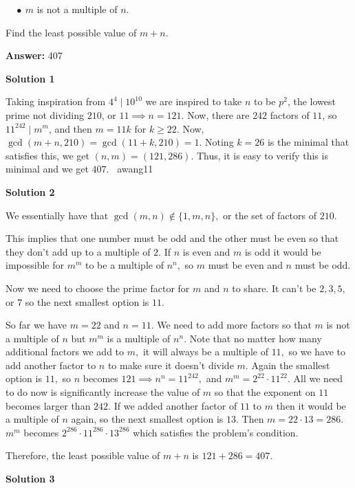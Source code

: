 \begin{enumerate}
 $\quad\bullet\ m$ is not a multiple of $n.$


 Find the least possible value of $m+n.$

 \textbf{Answer: }407



\textbf{Solution 1}

Taking inspiration from $4^4 \mid 10^{10}$ we are inspired to take $n$ to be $p^2$, the lowest prime not dividing $210$, or $11 \implies n = 121$. Now, there are $242$ factors of $11$, so $11^{242} \mid m^m$, and then $m = 11k$ for $k \geq 22$. Now, $\gcd(m+n, 210) = \gcd(11+k,210) = 1$. Noting $k = 26$ is the minimal that satisfies this, we get $(n,m) = (121,286)$. Thus, it is easy to verify this is minimal and we get $\boxed{407}$. ~awang11

 



\textbf{Solution 2}

We essentially have that $\gcd(m,n) \notin \{1, m, n\},$ or the set of factors of $210.$

 
This implies that one number must be odd and the other must be even so that they don’t add up to a multiple of $2.$ If $n$ is even and $m$ is odd it would be impossible for $m^m$ to be a multiple of $n^n,$ so $m$ must be even and $n$ must be odd. 

 Now we need to choose the prime factor for $m$ and $n$ to share. It can't be $2,3,5,$ or $7$ so the next smallest option is $11.$ 

 So far we have $m = 22$ and $n = 11.$ We need to add more factors so that $m$ is not a multiple of $n$ but $m^m$ is a multiple of $n^n.$ Note that no matter how many additional factors we add to $m,$ it will always be a multiple of $11,$ so we have to add another factor to $n$ to make sure it doesn't divide $m.$ Again the smallest option is $11,$ so $n$ becomes $121 \implies n^n = 11^{242},$ and $m^m = 2^{22} \cdot 11^{22}.$ All we need to do now is significantly increase the value of $m$ so that the exponent on $11$ becomes larger than $242.$ If we added another factor of $11$ to $m$ then it would be a multiple of $n$ again, so the next smallest option is $13.$ Then $m = 22\cdot 13 = 286.$ $m^m$ becomes $2^{286} \cdot 11^{286} \cdot 13^{286}$ which satisfies the problem's condition.

 Therefore, the least possible value of $m + n$ is $121 + 286 = \boxed{407}.$




\textbf{Solution 3}


\end{enumerate}
